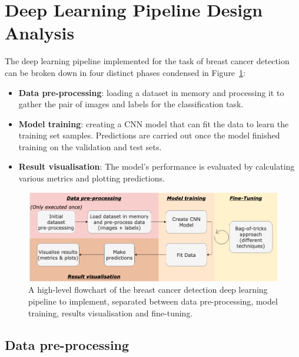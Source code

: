 
\section{Deep Learning Pipeline Design Analysis}

The deep learning pipeline implemented for the task of breast cancer detection can be broken down in four distinct phases condensed in Figure~\ref{fig:design-flowchart}:

\begin{itemize}
    \item \textbf{Data pre-processing}: loading a dataset in memory and processing it to gather the pair of images and labels for the classification task.
    \item \textbf{Model training}: creating a CNN model that can fit the data to learn the training set samples. Predictions are carried out once the model finished training on the validation and test sets.
    \item \textbf{Result visualisation}: The model's performance is evaluated by calculating various metrics and plotting predictions.
\end{itemize}

\begin{figure}[ht]
\centerline{\includegraphics[width=\textwidth]{figures/design/design flowchart.png}}
\caption{\label{fig:design-flowchart}A high-level flowchart of the breast cancer detection deep learning pipeline to implement, separated between data pre-processing, model training, results visualisation and fine-tuning.}
\end{figure}


\subsection{Data pre-processing}

